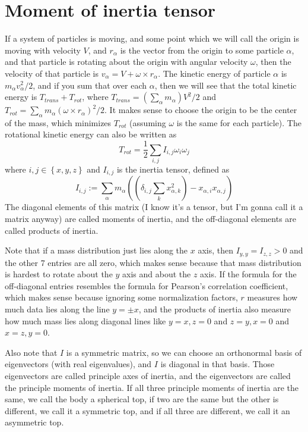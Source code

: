 \documentclass{article}
\begin{document}
\section{Moment of inertia tensor}
If a system of particles is moving, and some point which we will call the origin is moving with velocity $V$, and $r_\alpha$ is the vector from the origin to some particle $\alpha$, and that particle is rotating about the origin with angular velocity $\omega$, then the velocity of that particle is $v_\alpha = V + \omega \times r_\alpha$. The kinetic energy of particle $\alpha$ is $m_\alpha v_\alpha^2 / 2$, and if you sum that over each $\alpha$, then we will see that the total kinetic energy is $T_{trans} + T_{rot}$, where $T_{trans} = (\sum_\alpha m_\alpha) V^2/2$ and $T_{rot} = \sum_\alpha m_\alpha (\omega \times r_\alpha)^2 / 2$. It makes sense to choose the origin to be the center of the mass, which minimizes $T_{rot}$ (assuming $\omega$ is the same for each particle). The rotational kinetic energy can also be written as
\[ T_{rot} = \frac{1}{2} \sum_{i,j} I_{i,j}\omega_i \omega_j \]
where $i,j \in \left\{ x, y, z \right\}$ and $I_{i,j}$ is the inertia tensor, defined as
\[ I_{i,j} := \sum_\alpha m_\alpha \left( \left( \delta_{i,j} \sum_k x_{\alpha,k}^2 \right) - x_{\alpha,i}x_{\alpha,j} \right)  \]
The diagonal elements of this matrix (I know it's a tensor, but I'm gonna call it a matrix anyway) are called moments of inertia, and the off-diagonal elements are called products of inertia.
\par
Note that if a mass distribution just lies along the $x$ axis, then $I_{y,y}=I_{z,z} > 0$ and the other 7 entries are all zero, which makes sense because that mass distribution is hardest to rotate about the $y$ axis and about the $z$ axis. If the formula for the off-diagonal entries resembles the formula for Pearson's correlation coefficient, which makes sense because ignoring some normalization factors, $r$ measures how much data lies along the line $y= \pm x$, and the products of inertia also measure how much mass lies along diagonal lines like $y=x,z=0$ and $z=y,x=0$ and $x=z, y=0$.
\par
Also note that $I$ is a symmetric matrix, so we can choose an orthonormal basis of eigenvectors (with real eigenvalues), and $I$ is diagonal in that basis. Those eigenvectors are called principle axes of inertia, and the eigenvectors are called the principle moments of inertia. If all three principle moments of inertia are the same, we call the body a spherical top, if two are the same but the other is different, we call it a symmetric top, and if all three are different, we call it an asymmetric top.
\end{document}
